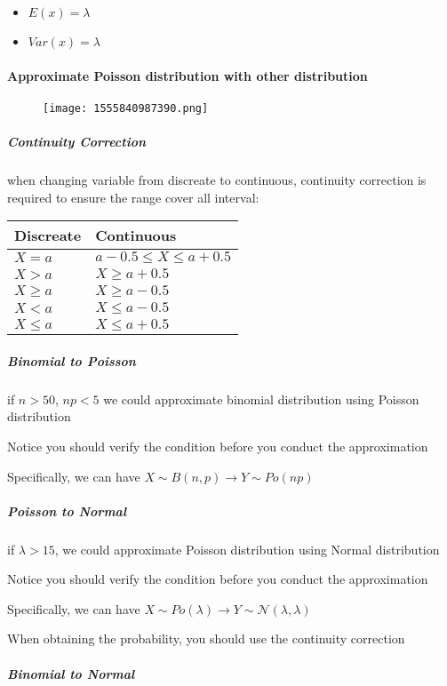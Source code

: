 \documentclass[]{article}
\let\oldparagraph\paragraph
\renewcommand{\paragraph}[1]{\oldparagraph{#1}\mbox{}}
\let\oldsubparagraph\subparagraph
\renewcommand{\subparagraph}[1]{\oldsubparagraph{#1}\mbox{}}
\begin{document}
\begin{itemize}
\item
  \(E(x) = \lambda\)
\item
  \(Var(x) = \lambda\)
\end{itemize}

\paragraph{Approximate Poisson distribution with other
distribution}\label{header-n69}

\begin{figure}
\centering
\texttt{[image: 1555840987390.png]}
\caption{}\label{mermaid}
\end{figure}

\subparagraph{Continuity Correction}\label{header-n71}

when changing variable from discreate to continuous, continuity
correction is required to ensure the range cover all interval:

\begin{longtable}[]{@{}ll@{}}
\toprule
Discreate & Continuous\tabularnewline
\midrule
\endhead
\(X=a\) & \(a-0.5 \le X \le a+0.5\)\tabularnewline
\(X>a\) & \(X\ge a+0.5\)\tabularnewline
\(X \ge a\) & \(X \ge a-0.5\)\tabularnewline
\(X<a\) & \(X\le a-0.5\)\tabularnewline
\(X \le a\) & \(X \le a+0.5\)\tabularnewline
\bottomrule
\end{longtable}

\subparagraph{Binomial to Poisson}\label{header-n72}

if \(n>50\), \(np<5\) we could approximate binomial distribution using
Poisson distribution

Notice you should verify the condition before you conduct the
approximation

Specifically, we can have \(X \sim B(n,p) \rightarrow Y \sim Po(np)\)

\subparagraph{Poisson to Normal}\label{header-n73}

if \(\lambda > 15\), we could approximate Poisson distribution using
Normal distribution

Notice you should verify the condition before you conduct the
approximation

Specifically, we can have
\(X \sim Po(\lambda) \rightarrow Y \sim \mathcal{N}(\lambda,\lambda)\)

When obtaining the probability, you should use the continuity correction

\subparagraph{Binomial to Normal}\label{header-n74}
\end{document}
